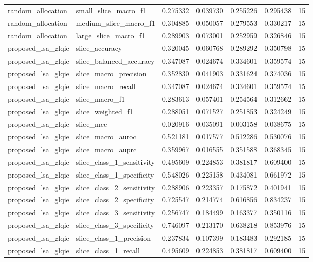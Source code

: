\begin{tabular}{llrrrrr}
random_allocation & small_slice_macro_f1 & 0.275332 & 0.039730 & 0.255226 & 0.295438 & 15 \\
random_allocation & medium_slice_macro_f1 & 0.304885 & 0.050057 & 0.279553 & 0.330217 & 15 \\
random_allocation & large_slice_macro_f1 & 0.289903 & 0.073001 & 0.252959 & 0.326846 & 15 \\
proposed_lsa_glqie & slice_accuracy & 0.320045 & 0.060768 & 0.289292 & 0.350798 & 15 \\
proposed_lsa_glqie & slice_balanced_accuracy & 0.347087 & 0.024674 & 0.334601 & 0.359574 & 15 \\
proposed_lsa_glqie & slice_macro_precision & 0.352830 & 0.041903 & 0.331624 & 0.374036 & 15 \\
proposed_lsa_glqie & slice_macro_recall & 0.347087 & 0.024674 & 0.334601 & 0.359574 & 15 \\
proposed_lsa_glqie & slice_macro_f1 & 0.283613 & 0.057401 & 0.254564 & 0.312662 & 15 \\
proposed_lsa_glqie & slice_weighted_f1 & 0.288051 & 0.071527 & 0.251853 & 0.324249 & 15 \\
proposed_lsa_glqie & slice_mcc & 0.020916 & 0.035091 & 0.003158 & 0.038675 & 15 \\
proposed_lsa_glqie & slice_macro_auroc & 0.521181 & 0.017577 & 0.512286 & 0.530076 & 15 \\
proposed_lsa_glqie & slice_macro_auprc & 0.359967 & 0.016555 & 0.351588 & 0.368345 & 15 \\
proposed_lsa_glqie & slice_class_1_sensitivity & 0.495609 & 0.224853 & 0.381817 & 0.609400 & 15 \\
proposed_lsa_glqie & slice_class_1_specificity & 0.548026 & 0.225158 & 0.434081 & 0.661972 & 15 \\
proposed_lsa_glqie & slice_class_2_sensitivity & 0.288906 & 0.223357 & 0.175872 & 0.401941 & 15 \\
proposed_lsa_glqie & slice_class_2_specificity & 0.725547 & 0.214774 & 0.616856 & 0.834237 & 15 \\
proposed_lsa_glqie & slice_class_3_sensitivity & 0.256747 & 0.184499 & 0.163377 & 0.350116 & 15 \\
proposed_lsa_glqie & slice_class_3_specificity & 0.746097 & 0.213170 & 0.638218 & 0.853976 & 15 \\
proposed_lsa_glqie & slice_class_1_precision & 0.237834 & 0.107399 & 0.183483 & 0.292185 & 15 \\
proposed_lsa_glqie & slice_class_1_recall & 0.495609 & 0.224853 & 0.381817 & 0.609400 & 15 \\

\end{tabular}
